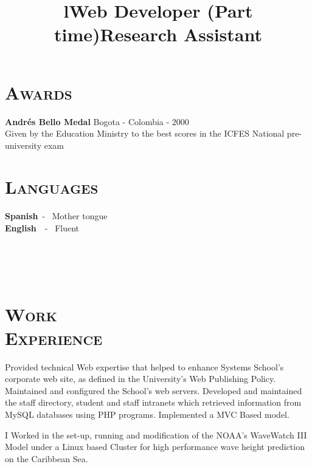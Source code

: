 \begin{resume}
\section{\textsc{Awards}}
\textbf{Andr\'{e}s Bello Medal} \hfill          Bogota - Colombia - 2000 \\
Given by the Education Ministry to the best scores in the ICFES National pre-university exam \hfill \\

\section{\textsc{Languages}}
\textbf{Spanish}\   - \  Mother tongue \\
\textbf{English}\ \  - \ Fluent 


\begin{formatb}
  \title{l}\\
 \\
  \body\\
\end{formatb}

\section{\textsc{Work\\ Experience}}

\title{\textbf{Web Developer} (Part time)}
\begin{position}
Provided technical Web expertise that helped to enhance Systems School's corporate web site, 
as defined in the University's Web Publishing Policy. Maintained and configured the School's web servers. Developed and maintained the staff directory, student and staff intranets which retrieved information from MySQL databases using PHP programs. Implemented a MVC Based model.
\end{position}

\title{\textbf{Research Assistant}}
\begin{position}
I Worked in the set-up, running and modification of the NOAA's WaveWatch III Model under a Linux based Cluster
for high performance wave height prediction on the Caribbean Sea.
\end{position}



\end{resume}
